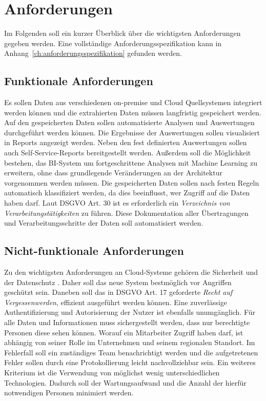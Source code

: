\section{Anforderungen}
\label{sec:anforderungen}
Im Folgenden soll ein kurzer Überblick über die wichtigsten Anforderungen gegeben werden. Eine vollständige Anforderungsspezifikation kann in Anhang~\ref{ch:anforderungsspezifikation} gefunden werden. 

\subsection{Funktionale Anforderungen}
Es sollen Daten aus verschiedenen on-premise und Cloud Quellsystemen integriert werden können und die extrahierten Daten müssen langfristig gespeichert werden. Auf den gespeicherten Daten sollen automatisierte Analysen und Auswertungen durchgeführt werden können. Die Ergebnisse der Auswertungen sollen visualisiert in Reports angezeigt werden. Neben den fest definierten Auswertungen sollen auch Self-Service-Reports bereitgestellt werden. Außerdem soll die Möglichkeit bestehen, das BI-System um fortgeschrittene Analysen mit Machine Learning zu erweitern, ohne dass grundlegende Veränderungen an der Architektur vorgenommen werden müssen. Die gespeicherten Daten sollen nach festen Regeln automatisch klassifiziert werden, da dies beeinflusst, wer Zugriff auf die Daten haben darf. Laut DSGVO Art. 30 ist es erforderlich ein \textit{Verzeichnis von Verarbeitungstätigkeiten} zu führen. Diese Dokumentation aller Übertragungen und Verarbeitungsschritte der Daten soll automatisiert werden. 

\subsection{Nicht-funktionale Anforderungen}
Zu den wichtigsten Anforderungen an Cloud-Systeme gehören die Sicherheit und der Datenschutz \cite{gurjar_cloud_2013}. Daher soll das neue System bestmöglich vor Angriffen geschützt sein. Daneben soll das in DSGVO Art. 17 geforderte \textit{Recht auf Vergessenwerden}, effizient ausgeführt werden können. Eine zuverlässige Authentifizierung und Autorisierung der Nutzer ist ebenfalls unumgänglich. Für alle Daten und Informationen muss sichergestellt werden, dass nur berechtigte Personen diese sehen können. Worauf ein Mitarbeiter Zugriff haben darf, ist abhängig von seiner Rolle im Unternehmen und seinem regionalen Standort. Im Fehlerfall soll ein zuständiges Team benachrichtigt werden und die aufgetretenen Fehler sollen durch eine Protokollierung leicht nachvollziehbar sein. Ein weiteres Kriterium ist die Verwendung von möglichst wenig unterschiedlichen Technologien. Dadurch soll der Wartungsaufwand und die Anzahl der hierfür notwendigen Personen minimiert werden.